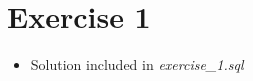 \documentclass[12pt]{article}
\begin{document}
\bigskip

\section{Exercise 1}

\bigskip

\begin{itemize}
    \item Solution included in \textit{exercise\_1.sql}
\end{itemize}

\bigskip
\end{document}
